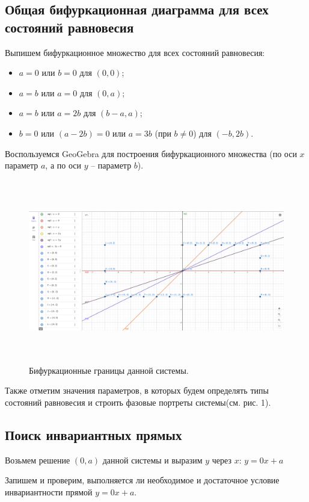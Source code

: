 \subsection{Общая бифуркационная диаграмма для всех состояний равновесия}
Выпишем бифуркационное множество для всех состояний равновесия: 
\begin{itemize}
\item{$a = 0$ или $ b = 0$ для $(0, 0)$;}
\item{$a = b$ или $ a = 0$ для $(0, a)$;}
\item{$a = b$ или $ a = 2b$ для $\left (b-a , a \right )$;}
\item{$b = 0$ или $(a-2b)=0$ или $a = 3b $ (при $b \ne 0 $)  для $ \left ( -b, 2b  \right ) $.}
\end{itemize}
Воспользуемся GeoGebra для построения бифуркационного множества (по оси $x$ параметр $a$, а по оси $y$ -- параметр $b$).
\begin{figure}[!thb]
\includegraphics[height=8cm]{bifdiag-4.png}
\centering
\caption{\label{fig:bifdiag2} Бифуркационные границы данной системы.}
\end{figure}
Также отметим значения параметров, в которых будем определять типы состояний равновесия и строить фазовые портреты системы(см. рис. 1).



\newpage
\newpage

\subsection{Поиск инвариантных прямых}
Возьмем решение $(0, a)$ данной системы и выразим $y$ через $x$: $y = 0x+a$

Запишем и проверим, выполняется ли необходимое и достаточное условие инвариантности прямой $y = 0x+a$. 


